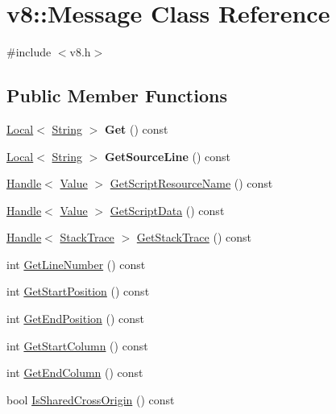 \hypertarget{classv8_1_1Message}{\section{v8\-:\-:Message Class Reference}
\label{classv8_1_1Message}
}


{\ttfamily \#include $<$v8.\-h$>$}

\subsection*{Public Member Functions}
\begin{DoxyCompactItemize}
\item 
\hypertarget{classv8_1_1Message_a72f26c7b684bbfbd14d5970849fdf3d2}{\hyperlink{classv8_1_1Local}{Local}$<$ \hyperlink{classv8_1_1String}{String} $>$ {\bfseries Get} () const }\label{classv8_1_1Message_a72f26c7b684bbfbd14d5970849fdf3d2}

\item 
\hypertarget{classv8_1_1Message_a0d5cceb5128a147818c72b82950e475d}{\hyperlink{classv8_1_1Local}{Local}$<$ \hyperlink{classv8_1_1String}{String} $>$ {\bfseries Get\-Source\-Line} () const }\label{classv8_1_1Message_a0d5cceb5128a147818c72b82950e475d}

\item 
\hyperlink{classv8_1_1Handle}{Handle}$<$ \hyperlink{classv8_1_1Value}{Value} $>$ \hyperlink{classv8_1_1Message_ac5d31afb758897cd1653c5eb3327a4d6}{Get\-Script\-Resource\-Name} () const 
\item 
\hyperlink{classv8_1_1Handle}{Handle}$<$ \hyperlink{classv8_1_1Value}{Value} $>$ \hyperlink{classv8_1_1Message_ace10c210ccbb542b1b75cadefbc4e899}{Get\-Script\-Data} () const 
\item 
\hyperlink{classv8_1_1Handle}{Handle}$<$ \hyperlink{classv8_1_1StackTrace}{Stack\-Trace} $>$ \hyperlink{classv8_1_1Message_adeffa297a5a28955dd16c084632aa645}{Get\-Stack\-Trace} () const 
\item 
int \hyperlink{classv8_1_1Message_a67f97fd76b8f98ed65743b9615d64a79}{Get\-Line\-Number} () const 
\item 
int \hyperlink{classv8_1_1Message_a31a550a1d3d09a2d72d0742be821956f}{Get\-Start\-Position} () const 
\item 
int \hyperlink{classv8_1_1Message_a50cbec87379e628b1647466926882037}{Get\-End\-Position} () const 
\item 
int \hyperlink{classv8_1_1Message_aab8007ba81d3f195280bce0693810cc2}{Get\-Start\-Column} () const 
\item 
int \hyperlink{classv8_1_1Message_aaf82cd7f7449add5f50d4253499cad05}{Get\-End\-Column} () const 
\item 
bool \hyperlink{classv8_1_1Message_a03228f50c40c45da52f424bdd64598d1}{Is\-Shared\-Cross\-Origin} () const 
\end{DoxyCompactItemize}
